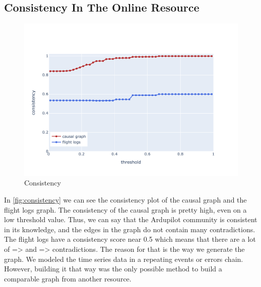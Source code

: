 \subsection{Consistency In The Online Resource}\label{subsec:consistency-question}
\begin{figure}
    \begin{center}
        \includegraphics[scale=.65]{figures/results/consistency}
        \caption{Consistency}\label{fig:consistency}
    \end{center}
\end{figure}
In \autoref{fig:consistency} we can see the consistency plot of the causal graph and the flight logs graph.
The consistency of the causal graph is pretty high, even on a low threshold value.
Thus, we can say that the Ardupilot community is consistent in its knowledge, and the edges in the graph do not contain many contradictions.
The flight logs have a consistency score near 0.5 which means that there are a lot of  =>  and  =>  contradictions.
The reason for that is the way we generate the graph.
We modeled the time series data in a repeating events or errors chain.
However, building it that way was the only possible method to build a comparable graph from another resource.

